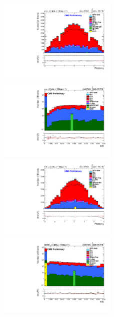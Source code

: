 \documentclass[oneside, a4paper, 11pt, ]{report}
\begin{document}
\begin{figure}
\includegraphics[width=0.5\textwidth]{Plots/ControlPlots/TTbarDiLeptonAnalysis/MuMu/Photons/AllPhotons/Photon_Eta_splitTTbar_ratio.pdf}
\includegraphics[width=0.5\textwidth]{Plots/ControlPlots/TTbarDiLeptonAnalysis/MuMu/Photons/AllPhotons/Log/Photon_HtowoE_splitTTbar_ratio.pdf}\\
\includegraphics[width=0.5\textwidth]{Plots/ControlPlots/TTbarDiLeptonAnalysis/EE/Photons/AllPhotons/Photon_Eta_splitTTbar_ratio.pdf}
\includegraphics[width=0.5\textwidth]{Plots/ControlPlots/TTbarDiLeptonAnalysis/EE/Photons/AllPhotons/Log/Photon_HtowoE_splitTTbar_ratio.pdf}\\

\end{figure}
\end{document}
